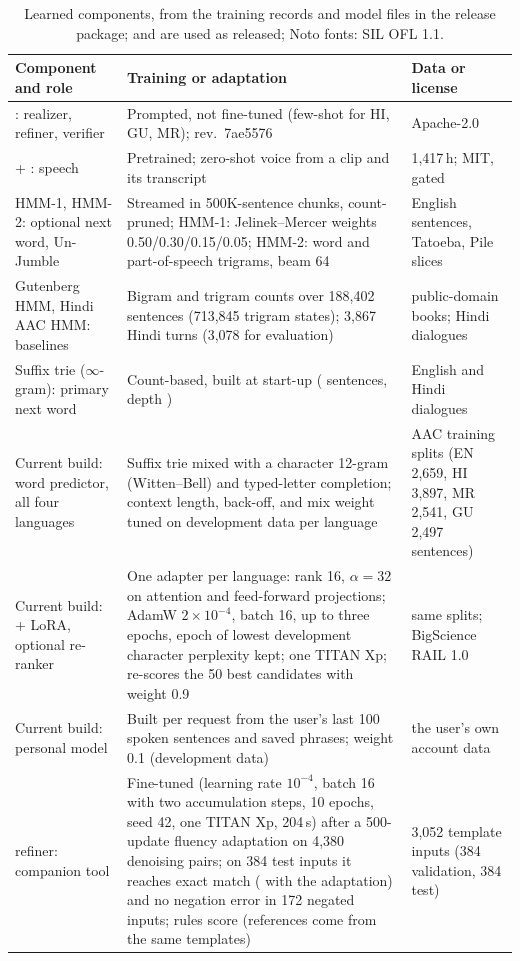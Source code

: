 \begin{table}[!t]
\centering\footnotesize
\setlength{\tabcolsep}{3pt}\renewcommand{\arraystretch}{1.02}
\begin{tabular}{@{}L{4.0cm}L{8.1cm}L{3.4cm}@{}}
\toprule
{}
Component and role & Training or adaptation & Data or license \\
\midrule
\qwen{}: realizer, refiner, verifier & Prompted, not fine-tuned (few-shot for HI, GU, MR); rev.\ 7ae5576 & Apache-2.0 \\
\indicf{} + \vocos{}: speech & Pretrained; zero-shot voice from a clip and its transcript & 1,417\,h; MIT, gated \\
HMM-1, HMM-2: optional next word, Un-Jumble & Streamed in 500K-sentence chunks, count-pruned; HMM-1: Jelinek--Mercer weights 0.50/0.30/0.15/0.05; HMM-2: word and part-of-speech trigrams, beam 64 & English sentences, Tatoeba, Pile slices \\
Gutenberg HMM, Hindi AAC HMM: baselines & Bigram and trigram counts over 188,402 sentences (713,845 trigram states); 3,867 Hindi turns (3,078 for evaluation) & public-domain books; Hindi dialogues \\
Suffix trie ($\infty$-gram): primary next word & Count-based, built at start-up (\IGSent{} sentences, depth \IGDepth{}) & English and Hindi dialogues \\
Current build: word predictor, all four languages & Suffix trie mixed with a character 12-gram (Witten--Bell) and typed-letter completion; context length, back-off, and mix weight tuned on development data per language & AAC training splits (EN 2,659, HI 3,897, MR 2,541, GU 2,497 sentences) \\
Current build: \bloom{} + LoRA, optional re-ranker & One adapter per language: rank 16, $\alpha=32$ on attention and feed-forward projections; AdamW $2\times10^{-4}$, batch 16, up to three epochs, epoch of lowest development character perplexity kept; one TITAN Xp; re-scores the 50 best candidates with weight 0.9 & same splits; BigScience RAIL 1.0 \\
Current build: personal model & Built per request from the user's last 100 spoken sentences and saved phrases; weight 0.1 (development data) & the user's own account data \\
\flant{} refiner: companion tool & Fine-tuned (learning rate $10^{-4}$, batch 16 with two accumulation steps, 10 epochs, seed 42, one TITAN Xp, 204\,s) after a 500-update fluency adaptation on 4,380 denoising pairs; on 384 test inputs it reaches \RefAModel{} exact match (\RefFModel{} with the adaptation) and no negation error in 172 negated inputs; rules score \RefARules{} (references come from the same templates) & 3,052 template inputs (384 validation, 384 test) \\
\bottomrule
\end{tabular}
\caption{Learned components, from the training records and model files in the release package; \qwen{} and \indicf{} are used as released; Noto fonts: SIL OFL 1.1.}
\label{tab:models}
\end{table}

